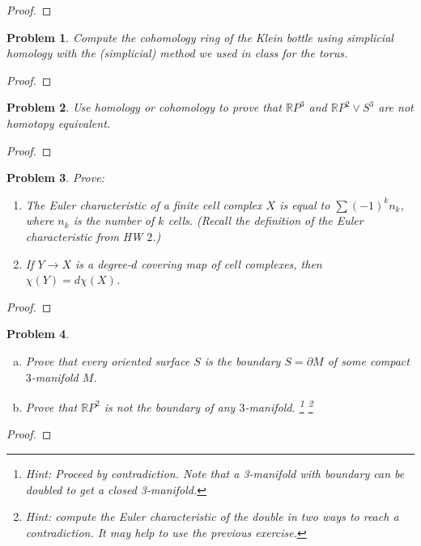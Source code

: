 \documentclass[11pt]{article}
\newtheorem{problem}{Problem}
\begin{document}
\begin{proof}

\end{proof}

\pagebreak 

\begin{problem}
Compute the cohomology ring of the Klein bottle using simplicial homology with the (simplicial) method we used in class for the torus. 
\end{problem}

\begin{proof}

\end{proof}

\pagebreak 

\begin{problem}
Use homology or cohomology to prove that $\mathbb RP^3$ and $\mathbb RP^2\vee S^3$ are not homotopy equivalent.  
\end{problem}

\begin{proof}

\end{proof}

\pagebreak 

\begin{problem}
Prove:
\begin{enumerate}
\item[(a)] The Euler characteristic of a finite cell complex $X$ is equal to $\sum (-1)^kn_k$, where $n_k$ is the number of $k$ cells. (Recall the definition of the Euler characteristic from HW $2$.)
\item[(b)] If $Y\to X$ is a degree-$d$ covering map of cell complexes, then $\chi(Y)=d\chi(X)$. 
\end{enumerate} 
\end{problem}

\begin{proof}

\end{proof}

\pagebreak 

\begin{problem}
\begin{enumerate}[(a)]
\item Prove that every oriented surface $S$ is the boundary $S=\partial M$ of some compact $3$-manifold $M$.
\item Prove that $\mathbb R P^2$ is not the boundary of any $3$-manifold. \footnote{Hint: Proceed by contradiction. Note that a 3-manifold with boundary can be doubled to get a closed 3-manifold.} \footnote{Hint: compute the Euler characteristic of the double in two ways to reach a contradiction. It may help to use the previous exercise.}
\end{enumerate} 
\end{problem}

\begin{proof}

\end{proof}
\end{document}
